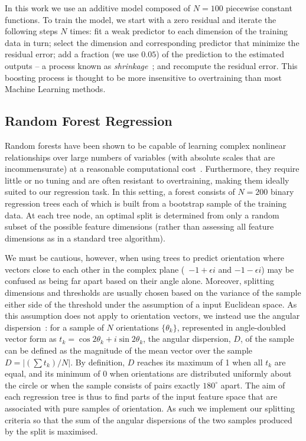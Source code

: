 \documentclass[10pt,twocolumn,letterpaper]{article}
\newcommand{\comment}[1]{}
\begin{document}
In this work we use an additive model composed of $N=100$ piecewise constant functions. To train the model, we start with a zero residual and iterate the following steps $N$ times: fit a weak predictor to each dimension of the training data in turn; select the dimension and corresponding predictor that minimize the residual error; add a fraction (we use $0.05$) of the prediction to the estimated outputs -- a process known as \emph{shrinkage}~\cite{Friedman_AoS01}; and recompute the residual error. This boosting process is thought to be more insensitive to overtraining than most Machine Learning methods.


\subsection{Random Forest Regression}
\label{s:learning_forest}
Random forests have been shown to be capable of learning complex nonlinear relationships over large numbers of variables (with absolute scales that are incommensurate) at a reasonable computational cost~\cite{Breiman_ML01}. Furthermore, they require little or no tuning and are often resistant to overtraining, making them ideally suited to our regression task. In this setting, a forest consists of $N=200$ binary regression trees each of which is built from a bootstrap sample of the training data. At each tree node, an optimal split is determined from only a random subset of the possible feature dimensions (rather than assessing all feature dimensions as in a standard tree algorithm).

We must be cautious, however, when using trees to predict orientation where vectors close to each other in the complex plane (\eg~$-1+\epsilon i$ and $-1-\epsilon i$) may be confused as being far apart based on their angle alone. Moreover, splitting dimensions and thresholds are usually chosen based on the variance of the sample either side of the threshold under the assumption of a input Euclidean space.
\comment{One reviewer complained about this previous sentence}%
As this assumption does not apply to orientation vectors, we instead use the angular dispersion~\cite{Mardia_Jupp_00}: for a sample of $N$ orientations $\{\theta_k\}$, represented in angle-doubled vector form as $t_k = \cos 2\theta_k + i\sin 2\theta_k$, the angular dispersion, $D$, of the sample can be defined as the magnitude of the mean vector over the sample \ie~$D = |(\sum{t_k})/N|$.
%
%
By definition, $D$ reaches its maximum of 1 when all $t_k$ are equal, and its minimum of 0 when orientations are distributed uniformly about the circle or when the sample consists of pairs exactly $180^\circ$ apart. The aim of each regression tree is thus to find parts of the input feature space that are associated with pure samples of orientation. As such we implement our splitting criteria so that the sum of the angular dispersions of the two samples produced by the split is maximised.
\end{document}
